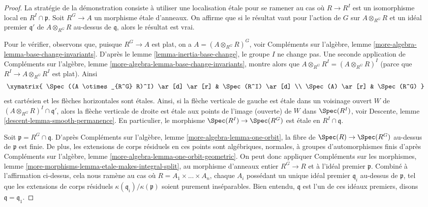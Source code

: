 \begin{proof}
La stratégie de la démonstration consiste à utiliser une localisation étale pour
se ramener au cas où $R \to R^I$ est un isomorphisme local en
$R^I \cap \mathfrak p$.
Soit $R^G \to A$ un morphisme étale d'anneaux. On affirme que si le résultat
vaut pour l'action de $G$ sur $A \otimes_{R^G} R$ et un idéal premier
$\mathfrak q'$ de $A \otimes_{R^G} R$ au-dessus de $\mathfrak q$, alors
le résultat est vrai.

\medskip\noindent
Pour le vérifier, observons que, puisque $R^G \to A$ est plat, on a
$A = (A \otimes_{R^G} R)^G$, voir Compléments sur l'algèbre,
lemme \ref{more-algebra-lemma-base-change-invariants}.
D'après le lemme \ref{lemma-inertia-base-change}, le groupe $I$ ne change pas.
Une seconde application de Compléments sur l'algèbre,
lemme \ref{more-algebra-lemma-base-change-invariants},
montre alors que $A \otimes_{R^G} R^I = (A \otimes_{R^G} R)^I$
(parce que $R^I \to A \otimes_{R^G} R^I$ est plat).
Ainsi
$$
\xymatrix{
\Spec((A \otimes_{R^G} R)^I) \ar[d] \ar[r] & \Spec(R^I) \ar[d] \\
\Spec(A) \ar[r] & \Spec(R^G)
}
$$
est cartésien et les flèches horizontales sont étales. Ainsi, si la
flèche verticale de gauche est étale dans un voisinage ouvert $W$ de
$(A \otimes_{R^G} R)^I \cap \mathfrak q'$, alors la flèche verticale de droite
est étale aux points de l'image (ouverte) de $W$ dans
$\Spec(R^I)$, voir
Descente, lemme \ref{descent-lemma-smooth-permanence}. En particulier,
le morphisme $\Spec(R^I) \to \Spec(R^G)$ est étale en $R^I \cap \mathfrak q$.

\medskip\noindent
Soit $\mathfrak p = R^G \cap \mathfrak q$.
D'après Compléments sur l'algèbre, lemme \ref{more-algebra-lemma-one-orbit},
la fibre de $\Spec(R) \to \Spec(R^G)$ au-dessus de $\mathfrak p$ est
finie. De plus, les extensions de corps résiduels en ces points
sont algébriques, normales, à groupes d'automorphismes finis d'après
Compléments sur l'algèbre, lemme \ref{more-algebra-lemma-one-orbit-geometric}.
On peut donc appliquer
Compléments sur les morphismes,
lemme \ref{more-morphisms-lemma-etale-makes-integral-split},
au morphisme d'anneaux entier $R^G \to R$ et à l'idéal premier $\mathfrak p$.
Combiné à l'affirmation ci-dessus, cela nous ramène au cas où
$R = A_1 \times \ldots \times A_n$, chaque $A_i$ possédant un unique
idéal premier $\mathfrak q_i$ au-dessus de $\mathfrak p$, tel que les
extensions de corps résiduels $\kappa(\mathfrak q_i)/\kappa(\mathfrak p)$
soient purement inséparables. Bien entendu, $\mathfrak q$ est l'un de
ces idéaux premiers, disons $\mathfrak q = \mathfrak q_1$.


\end{proof}

